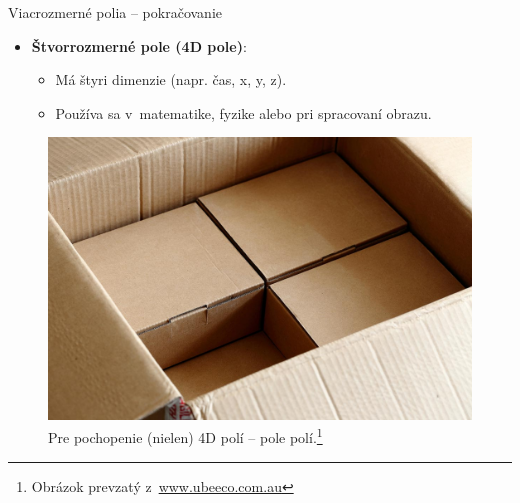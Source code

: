 \documentclass[xcolor=dvipsnames]{beamer}
\begin{document}
\begin{frame}{Viacrozmerné polia -- pokračovanie}
\begin{itemize}
        \item \textbf{Štvorrozmerné pole (4D pole)}:
        \begin{itemize}
            \item Má štyri dimenzie (napr. čas, x, y, z).
            \item Používa sa v~matematike, fyzike alebo pri spracovaní obrazu.
        \end{itemize}
    \end{itemize}
    \begin{figure}
        \centering
        \includegraphics[width=0.5\linewidth]{latexprez.jpg}
        \caption{Pre pochopenie (nielen) 4D polí -- pole polí.\footnote{Obrázok prevzatý z~\href{https://www.ubeeco.com.au/news/2017/02/12/custom-made-boxes-avoid-set-up-charges/}{www.ubeeco.com.au}}}
        \label{fig:4D_array_example}
    \end{figure}
\end{frame}
\end{document}

